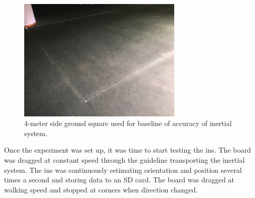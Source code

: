 \begin{figure}[!h]
    \centering
    \includegraphics[width=0.7\textwidth]{figures/indoor.jpg}
    \caption{4-meter side ground square used for baseline of accuracy of inertial system.}
    \label{fig:indoor_square}
\end{figure}

Once the experiment was set up, it was time to start testing the \acrshort{ins}. The board was dragged at constant speed through the guideline transporting the inertial system. The \acrshort{ins} was continuously estimating orientation and position several times a second and storing data to an SD card. The board was dragged at walking speed and stopped at corners when direction changed.

